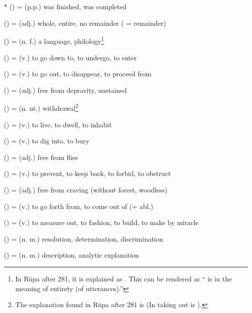 \section*{}\label{upasagga:ni}
\begin{compactitem}
\item {}* () = (p.p.) was finished, was completed
\item {} () = (adj.) whole, entire, no remainder ( = remainder)
\item {} () = (n. f.) a language, philology\footnote{In R\=upa after 281, it is explained as . This can be rendered as `` is in the meaning of entirety (of utterances).''}
\item {} () = (v.) to go down to, to undergo, to enter
\item {} () = (v.) to go out, to disappear, to proceed from
\item {} () = (adj.) free from depravity, unstained
\item {} () = (n. nt.) withdrawal\footnote{The explanation found in R\=upa after 281 is  (In taking out is ).}
\item {} () = (v.) to live, to dwell, to inhabit
\item {} () = (v.) to dig into, to bury 
\item {} () = (adj.) free from flies 
\item {} () = (v.) to prevent, to keep back, to forbid, to obstruct
\item {} () = (adj.) free from craving (without forest, woodless)
\item {} () = (v.) to go forth from, to come out of (+ abl.)
\item {} () = (v.) to measure out, to fashion, to build, to make by miracle 
\item {} () = (n. m.) resolution, determination, discrimination 
\item {} () = (n. m.) description, analytic explanation 

\end{compactitem}
